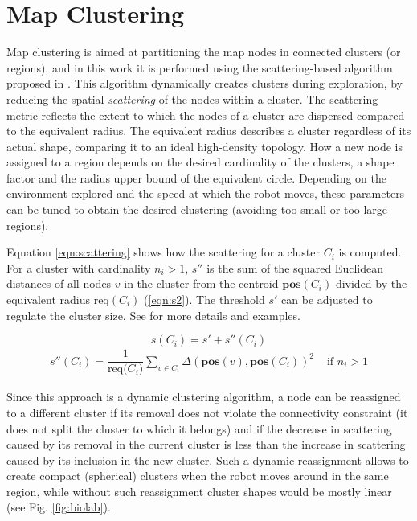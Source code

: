 \documentclass[letterpaper, 10 pt, conference]{ieeeconf}  %
\begin{document}
\section{Map Clustering} \label{clustering}
Map clustering is aimed at partitioning the map nodes in connected clusters (or regions), and in this work it is performed using the scattering-based algorithm proposed in \cite{b12}. This algorithm dynamically creates clusters during exploration, by reducing the spatial \textit{scattering} of the nodes within a cluster. The scattering metric reflects the extent to which the nodes of a cluster are dispersed compared to the equivalent radius. The equivalent radius describes a cluster regardless of its actual shape, comparing it to an ideal high-density topology. How a new node is assigned to a region depends on the desired cardinality of the clusters, a shape factor and the radius upper bound of the equivalent circle. Depending on the environment explored and the speed at which the robot moves, these parameters can be tuned to obtain the desired clustering (avoiding too small or too large regions). 

 

Equation \ref{eqn:scattering} shows how the scattering for a cluster $C_i$ is computed. For a cluster with cardinality $n_i > 1$, $s''$ is the sum of the squared Euclidean distances of all nodes $v$ in the cluster from the centroid $\mathbf{pos}(C_i)$ divided by the equivalent radius $\text{req}(C_i)$ (\ref{eqn:s2}). The threshold $s'$ can be adjusted to regulate the cluster size. See \cite{b12} for more details and examples.



\begin{equation} \label{eqn:scattering}
    s(C_i) = s' + s''(C_i)
\end{equation}
\begin{equation} \label{eqn:s2}
\begin{aligned}
s''(C_i)= \dfrac{1}{\text{req($C_i$)}}\sum_{v\in C_i} \Delta(\mathbf{pos}(v), \mathbf{pos}(C_i))^2 & \text{ if $n_i > 1$}
\end{aligned}
\end{equation}




Since this approach is a dynamic clustering algorithm, a node can be reassigned to a different cluster if its removal does not violate the connectivity constraint (it does not split the cluster to which it belongs) and if the decrease in scattering caused by its removal in the current cluster is less than the increase in scattering caused by its inclusion in the new cluster. Such a dynamic reassignment allows to create compact (spherical) clusters when the robot moves around in the same region, while without such reassignment cluster shapes would be mostly linear (see Fig. \ref{fig:biolab}). 
\end{document}
